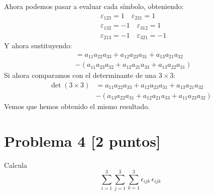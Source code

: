 \documentclass[12pt,reqno]{article}
\begin{document}
	Ahora podemos pasar a evaluar cada símbolo, obteniendo:
	\begin{equation*}
		\begin{split}
			&\varepsilon_{123}=1\quad \varepsilon_{231}=1\\
			&\varepsilon_{132}=-1\quad \varepsilon_{312}=1\\
			&\varepsilon_{213}=-1\quad\varepsilon_{321}=-1
		\end{split}
	\end{equation*}
	Y ahora sustituyendo:
	\begin{equation*}
		\begin{split}
			&=a_{11}a_{22}a_{33}+a_{12}a_{23}a_{31}+a_{13}a_{21}a_{32}\\
			&-(a_{11}a_{23}a_{32}+a_{12}a_{21}a_{33}+a_{13}a_{22}a_{31})
		\end{split}
	\end{equation*}
	Si ahora comparamos con el determinante de una $3 \times 3$:
	\begin{equation*}
		\begin{split}
			\det(3 \times 3)&=a_{11}a_{22}a_{33}+a_{12}a_{23}a_{31}+a_{13}a_{21}a_{32}\\
							&-(a_{13}a_{22}a_{31}+a_{12}a_{21}a_{33}+a_{11}a_{23}a_{32})
		\end{split}
	\end{equation*}
	Vemos que hemos obtenido el mismo resultado.
	\section*{Problema 4 [2 puntos]}
	Calcula
	\begin{equation*}
		\sum_{i=1}^{3}\sum_{j=1}^{3}\sum_{k=1}^{3}\epsilon_{ijk}\,\epsilon_{ijk}
	\end{equation*}
\end{document}
